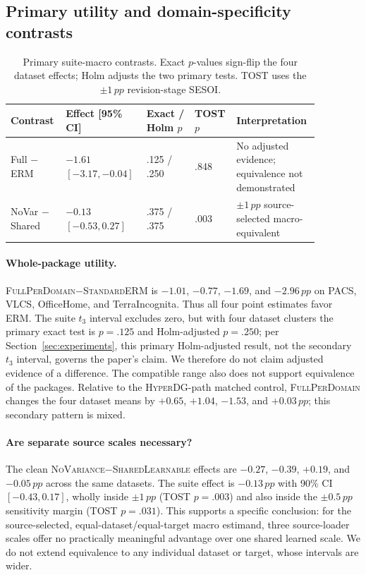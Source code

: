 \documentclass[10pt]{article}
\newcommand{\method}{\textsc{HyperDG}}
\newcommand{\pp}{\,pp}
\newcommand{\full}{\textsc{FullPerDomain}}
\newcommand{\erm}{\textsc{StandardERM}}
\newcommand{\shared}{\textsc{SharedLearnable}}
\newcommand{\novar}{\textsc{NoVariance}}
\begin{document}
\subsection{Primary utility and domain-specificity contrasts}

\begin{table}[t]
\centering
\small
\caption{Primary suite-macro contrasts. Exact $p$-values sign-flip the four
dataset effects; Holm adjusts the two primary tests. TOST uses the
$\pm1\pp$ revision-stage SESOI.}
\label{tab:primary}
\setlength{\tabcolsep}{3pt}
\begin{tabular}{p{0.15\linewidth}p{0.22\linewidth}p{0.15\linewidth}p{0.10\linewidth}p{0.25\linewidth}}
\toprule
Contrast & Effect [95\% CI] & Exact / Holm $p$ & TOST $p$ & Interpretation \\
\midrule
Full $-$ ERM &
$-1.61$ $[-3.17,-0.04]$ & .125 / .250 & .848 &
No adjusted evidence; equivalence not demonstrated \\
NoVar $-$ Shared &
$-0.13$ $[-0.53,0.27]$ & .375 / .375 & .003 &
$\pm1\pp$ source-selected macro-equivalent \\
\bottomrule
\end{tabular}
\end{table}

\paragraph{Whole-package utility.}
\full{}$-$\erm{} is $-1.01$, $-0.77$, $-1.69$, and $-2.96\pp$ on PACS, VLCS,
OfficeHome, and TerraIncognita. Thus all four point estimates favor ERM.
The suite $t_3$ interval excludes zero, but with four dataset clusters the
primary exact test is $p=.125$ and Holm-adjusted $p=.250$; per
Section~\ref{sec:experiments}, this primary Holm-adjusted result, not the
secondary $t_3$ interval, governs the paper's claim. We therefore do not
claim adjusted evidence of a difference. The compatible range also does not
support equivalence of the packages. Relative to the \method{}-path matched control,
\full{} changes the four dataset means by $+0.65$, $+1.04$, $-1.53$, and
$+0.03\pp$; this secondary pattern is mixed.

\paragraph{Are separate source scales necessary?}
The clean \novar{}$-$\shared{} effects are $-0.27$, $-0.39$, $+0.19$, and
$-0.05\pp$ across the same datasets. The suite effect is $-0.13\pp$ with
90\% CI $[-0.43,0.17]$, wholly inside $\pm1\pp$ (TOST $p=.003$) and also
inside the $\pm0.5\pp$ sensitivity margin (TOST $p=.031$). This supports a
specific conclusion: for the source-selected, equal-dataset/equal-target
macro estimand, three source-loader scales offer no practically meaningful
advantage over one shared learned scale. We do not extend equivalence to any
individual dataset or target, whose intervals are wider.
\end{document}
